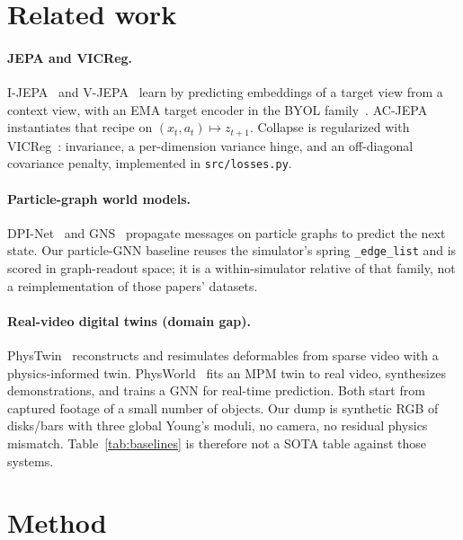 \documentclass{article}
\begin{document}
\section{Related work}
\paragraph{JEPA and VICReg.}
I-JEPA~\citep{assran2023ijepa} and V-JEPA~\citep{bardes2024vjepa} learn by
predicting embeddings of a target view from a context view, with an EMA target
encoder in the BYOL family~\citep{grill2020byol}. AC-JEPA instantiates that
recipe on $(x_t,a_t)\mapsto z_{t+1}$. Collapse is regularized with
VICReg~\citep{bardes2022vicreg}: invariance, a per-dimension variance hinge, and
an off-diagonal covariance penalty, implemented in \texttt{src/losses.py}.

\paragraph{Particle-graph world models.}
DPI-Net~\citep{li2019dpinet} and GNS~\citep{sanchezgonzalez2020gns} propagate
messages on particle graphs to predict the next state. Our particle-GNN baseline
reuses the simulator's spring \texttt{\_edge\_list} and is scored in graph-readout
space; it is a within-simulator relative of that family, not a reimplementation
of those papers' datasets.

\paragraph{Real-video digital twins (domain gap).}
PhysTwin~\citep{jiang2025phystwin} reconstructs and resimulates deformables from
sparse video with a physics-informed twin. PhysWorld~\citep{yang2025physworld}
fits an MPM twin to real video, synthesizes demonstrations, and trains a GNN for
real-time prediction. Both start from captured footage of a small number of
objects. Our dump is synthetic RGB of disks/bars with three global Young's
moduli, no camera, no residual physics mismatch. Table~\ref{tab:baselines} is
therefore not a SOTA table against those systems.

\section{Method}
\end{document}
